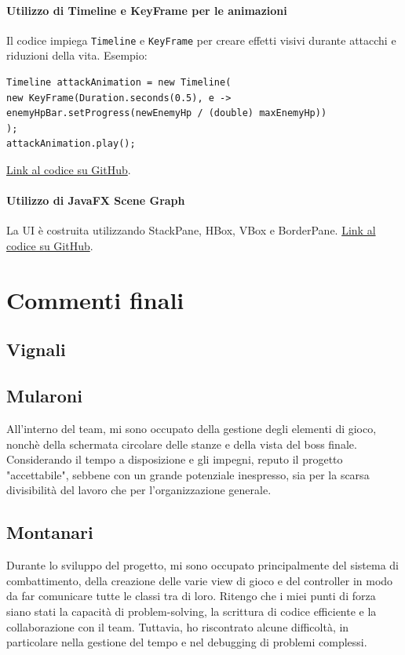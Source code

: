 \documentclass[a4paper,12pt]{report}
\begin{document}
\subsubsection{Utilizzo di Timeline e KeyFrame per le animazioni}
Il codice impiega \texttt{Timeline} e \texttt{KeyFrame} per creare effetti visivi durante attacchi e riduzioni della vita.\newline
Esempio:
\begin{verbatim}
Timeline attackAnimation = new Timeline(
new KeyFrame(Duration.seconds(0.5), e -> enemyHpBar.setProgress(newEnemyHp / (double) maxEnemyHp))
);
attackAnimation.play();
\end{verbatim}
\href{https://github.com/}{Link al codice su GitHub}.

\subsubsection{Utilizzo di JavaFX Scene Graph}
La UI è costruita utilizzando StackPane, HBox, VBox e BorderPane.\newline
\href{https://github.com/}{Link al codice su GitHub}.

\chapter{Commenti finali}

\section{Vignali}

\section{Mularoni}
All'interno del team, mi sono occupato della gestione degli elementi di gioco, nonchè della schermata circolare delle stanze e della vista del boss finale.\newline
Considerando il tempo a disposizione e gli impegni, reputo il progetto "accettabile", sebbene con un grande potenziale inespresso, sia per la scarsa divisibilità del lavoro che per l'organizzazione generale.

\section{Montanari}
Durante lo sviluppo del progetto, mi sono occupato principalmente del sistema di combattimento, della creazione delle varie view di gioco e del controller in modo da far comunicare tutte le classi tra di loro. Ritengo che i miei punti di forza siano stati la capacità di problem-solving, la scrittura di codice efficiente e la collaborazione con il team. Tuttavia, ho riscontrato alcune difficoltà, in particolare nella gestione del tempo e nel debugging di problemi complessi.
\end{document}
